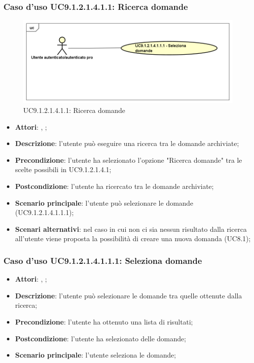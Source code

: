 							\subsubsection{Caso d'uso UC9.1.2.1.4.1.1: Ricerca domande}
							\label{UC9.1.2.1.4.1.1}
							\begin{figure}[h]
								\centering
								\includegraphics[scale=0.5,keepaspectratio]{UML/UC9_1_2_1_4_1_1.png}
								\caption{UC9.1.2.1.4.1.1: Ricerca domande}
							\end{figure}
							\FloatBarrier
							\begin{itemize}
								\item \textbf{Attori}: \uau, \uaupro;
								\item \textbf{Descrizione}: l'utente può eseguire una ricerca tra le domande archiviate; 
								\item \textbf{Precondizione}: l'utente ha selezionato l'opzione "Ricerca domande" tra le scelte possibili in UC9.1.2.1.4.1;
								\item \textbf{Postcondizione}: l'utente ha ricercato tra le domande archiviate;
								\item \textbf{Scenario principale}: l'utente può selezionare le domande (UC9.1.2.1.4.1.1.1); 
								\item \textbf{Scenari alternativi}: nel caso in cui non ci sia nessun risultato dalla ricerca all'utente viene proposta la possibilità di creare una nuova domanda (UC8.1);
							\end{itemize}
							
								\subsubsection{Caso d'uso UC9.1.2.1.4.1.1.1: Seleziona domande}
								\label{UC9.1.2.1.4.1.1.1}
								\begin{itemize}
									\item \textbf{Attori}: \uau, \uaupro;
									\item \textbf{Descrizione}: l'utente può selezionare le domande tra quelle ottenute dalla ricerca;
									\item \textbf{Precondizione}: l'utente ha ottenuto una lista di risultati;
									\item \textbf{Postcondizione}: l'utente ha selezionato delle domande; 
									\item \textbf{Scenario principale}: l'utente seleziona le domande;
								\end{itemize}
							
